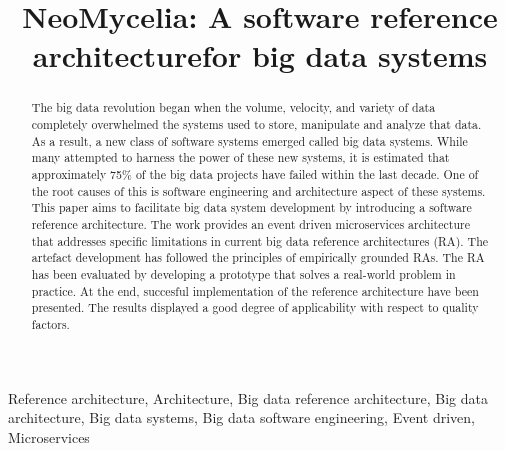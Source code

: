 \documentclass[10pt, conference]{IEEEtran}
\begin{document}
\title{NeoMycelia: A software reference architecturefor big data systems\\
}

\author{
    \and
}

\maketitle


\begin{abstract}
    The big data revolution began when the volume, velocity, and variety of data completely overwhelmed the systems used to store, manipulate and analyze that data. As a result, a new class of software systems emerged called big data systems. While many attempted to harness the power of these new systems, it is estimated that approximately 75\% of the big data projects have failed within the last decade. One of the root causes of this is software engineering and architecture aspect of these systems. This paper aims to facilitate big data system development by introducing a software reference architecture. The work provides an event driven microservices architecture that addresses specific limitations in current big data reference architectures (RA). The artefact development has followed the principles of empirically grounded RAs. The RA has been evaluated by developing a prototype that solves a real-world problem in practice. At the end, succesful implementation of the reference architecture have been presented. The results displayed a good degree of applicability with respect to quality factors.
\end{abstract}


\begin{IEEEkeywords}
    Reference architecture, Architecture, Big data reference architecture, Big data architecture, Big data systems, Big data software engineering, Event driven, Microservices
\end{IEEEkeywords}
\end{document}
